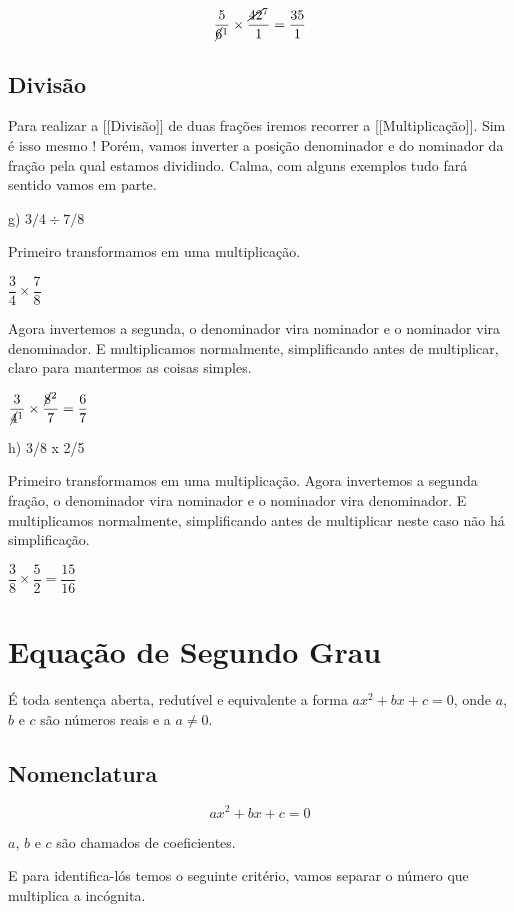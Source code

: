 \documentclass[letterpaper]{book}
\begin{document}
\[\dfrac{5}{\cancel{6}^{1}} \times \dfrac{\cancel{42}^{7}}{1} = \dfrac{35}{1}\]

\subsection{Divisão}

Para realizar a [[Divisão]] de duas frações iremos recorrer a [[Multiplicação]]. Sim é isso mesmo ! Porém, vamos inverter a posição denominador e do nominador da fração pela qual estamos dividindo. Calma, com alguns exemplos tudo fará sentido vamos em parte.

g) \(3/4 \div 7/8\) 


Primeiro transformamos em uma multiplicação.

\(\dfrac{3}{4} \times \dfrac{7}{8}\) 

Agora invertemos a segunda, o denominador vira nominador e o nominador vira denominador. E multiplicamos normalmente, simplificando antes de multiplicar, claro para mantermos as coisas simples.

\(\dfrac{3}{\cancel{4}^{1}} \times \dfrac{\cancel{8}^{2}}{7} = \dfrac{6}{7}\)


h) 3/8 x 2/5

Primeiro transformamos em uma multiplicação. Agora invertemos a segunda fração, o denominador vira nominador e o nominador vira denominador. E multiplicamos normalmente, simplificando antes de multiplicar neste caso não há simplificação.

\(\dfrac{3}{8} \times \dfrac{5}{2} = \dfrac{15}{16}\)

\section{Equação de Segundo Grau}

É toda sentença aberta, redutível e equivalente a forma \(ax^{2}+ bx + c = 0\), onde $a$, $b$ e $c$ são números reais e a $a \neq 0$.

\subsection{Nomenclatura}

\[ax^{2}+ bx + c = 0\]

\begin{center}\(a\), \(b\) e \(c\) são chamados de coeficientes.
\end{center}


E para identifica-lós temos o seguinte critério, vamos separar o número que multiplica a incógnita. 
\end{document}
